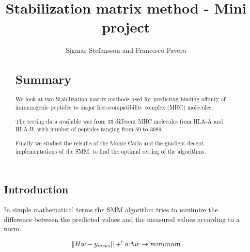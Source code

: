 \documentclass{bioinfo}
\begin{document}
\begin{application}

\title[SMM Project]{Stabilization matrix method - Mini project}
\author[Sigmar Stefansson, Francesco Favero]{Sigmar Stefansson and Francesco Favero}
\address{Danmarks Tekniske Univeristet}



\maketitle

\begin{abstract}

\section{Summary}
We look at two Stabilization matrix methods \cite{SMM} used for predicting binding affinity of immunogenic peptides to major histocompatibility complex \cite{wiki:MHC} (MHC) molecules.
\par The testing data available was from 35 different MHC molecules from HLA-A and HLA-B, with number of peptides ranging from 59 to 3089.
\par Finally we studied the relsults of the Monte Carlo and the gradient decent implementations of the SMM, to find the optimal setting of the algorithms.

\end{abstract}

\section*{Introduction}

In simple mathematical terms the SMM algorithm tries to minimize the difference between the predicted values and the measured values according to a norm.

\begin{equation}
\label{eq:01}
\| H w - y_{meas}\| + ^tw \Lambda w \rightarrow minimum \\
\end{equation}


\end{application}
\end{document}
